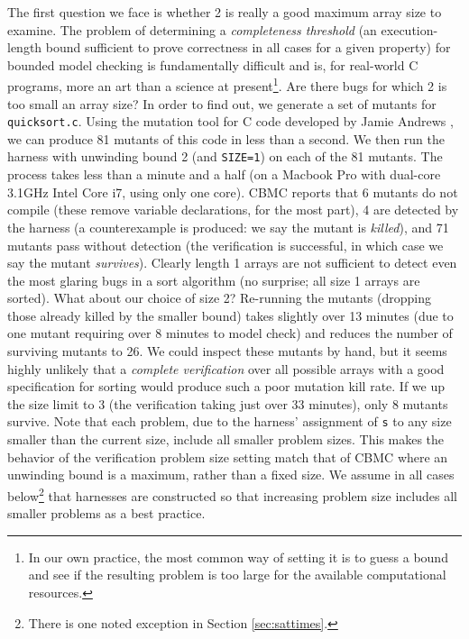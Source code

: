 \documentclass[conference]{IEEEtran}
\begin{document}
The first question we face is whether 2 is really a good maximum array
size to examine.  The problem of determining a \emph{completeness
  threshold} (an execution-length bound sufficient to prove correctness
in all cases for a given property) for bounded model checking is
fundamentally difficult \cite{CTDaniel} and is, for real-world C
programs, more an art than a science at present\footnote{In our own
  practice, the most common way of setting it is to guess a bound and
  see if the resulting problem is too large for the available
  computational resources.}.  Are there bugs for which 2 is too small
an array size?  In order to find out, we generate a set of mutants for
{\tt quicksort.c}.  Using the mutation tool for C code developed by
Jamie Andrews \cite{mutant}, we can produce 81 mutants of this code in
less than a second.  We then run the harness with unwinding bound 2
(and {\tt SIZE=1}) on each of the 81 mutants.  The process takes less
than a minute and a half (on a Macbook Pro with dual-core 3.1GHz Intel
Core i7, using only one core).  CBMC reports that 6 mutants do not
compile (these remove variable declarations, for the most part), 4 are
detected by the harness (a counterexample is produced: we say the
mutant is \emph{killed}), and 71 mutants pass without detection (the
verification is successful, in which case we say the mutant \emph{survives}).
Clearly length 1 arrays are not sufficient to detect even the most
glaring bugs in a sort algorithm (no surprise; all size 1 arrays are
sorted).  What about our choice of size 2?  Re-running the mutants
(dropping those already killed by the smaller bound) takes slightly
over 13 minutes (due to one mutant requiring over 8 minutes
to model check) and reduces the number of surviving mutants to 26.  We
could inspect these mutants by hand, but it seems highly unlikely that
a \emph{complete verification} over all possible arrays with a good
specification for sorting would produce such a poor mutation kill rate.
If we up the size limit to 3 (the verification taking just over 33
minutes), only 8 mutants survive.  Note that each problem, due to the
harness' assignment of {\tt s} to any size smaller than the current
size, include all smaller problem sizes. This makes the behavior of
the verification problem size setting match that of CBMC where an unwinding bound is a maximum, rather than
a fixed size.  We assume in all cases below\footnote{There is
  one noted exception in Section \ref{sec:sattimes}.} that harnesses are
constructed so that increasing problem size includes all smaller
problems as a best practice.
\end{document}
